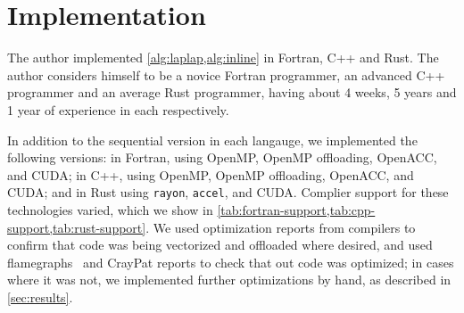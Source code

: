 \documentclass[british]{scrreprt}
\begin{document}


% 

\section{Implementation}
\label{sec:implementation}
The author implemented \cref{alg:laplap,alg:inline} in Fortran, C++ and Rust. The author considers himself to be a novice Fortran programmer, an advanced C++ programmer and an average Rust programmer, having about 4 weeks, 5 years and 1 year of experience in each respectively.

In addition to the sequential version in each langauge, we implemented the following versions: in Fortran, using OpenMP, OpenMP offloading, OpenACC, and CUDA; in C++, using OpenMP, OpenMP offloading, OpenACC, and CUDA; and in Rust using \texttt{rayon}, \texttt{accel}, and CUDA. Complier support for these technologies varied, which we show in \cref{tab:fortran-support,tab:cpp-support,tab:rust-support}. We used optimization reports from compilers to confirm that code was being vectorized and offloaded where desired, and used flamegraphs~\cite{Greggflamegraph2016} and CrayPat reports to check that out code was optimized; in cases where it was not, we implemented further optimizations by hand, as described in \cref{sec:results}.
\end{document}
